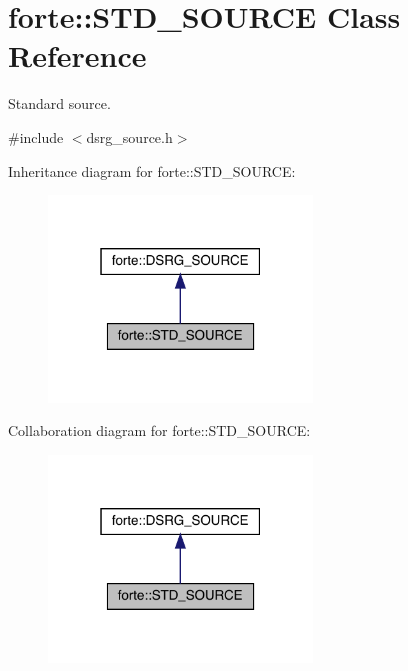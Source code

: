 \hypertarget{classforte_1_1_s_t_d___s_o_u_r_c_e}{}\section{forte\+:\+:S\+T\+D\+\_\+\+S\+O\+U\+R\+CE Class Reference}
\label{classforte_1_1_s_t_d___s_o_u_r_c_e}


Standard source.  




{\ttfamily \#include $<$dsrg\+\_\+source.\+h$>$}



Inheritance diagram for forte\+:\+:S\+T\+D\+\_\+\+S\+O\+U\+R\+CE\+:
\nopagebreak
\begin{figure}[H]
\begin{center}
\leavevmode
\includegraphics[width=199pt]{classforte_1_1_s_t_d___s_o_u_r_c_e__inherit__graph}
\end{center}
\end{figure}


Collaboration diagram for forte\+:\+:S\+T\+D\+\_\+\+S\+O\+U\+R\+CE\+:
\nopagebreak
\begin{figure}[H]
\begin{center}
\leavevmode
\includegraphics[width=199pt]{classforte_1_1_s_t_d___s_o_u_r_c_e__coll__graph}
\end{center}
\end{figure}
